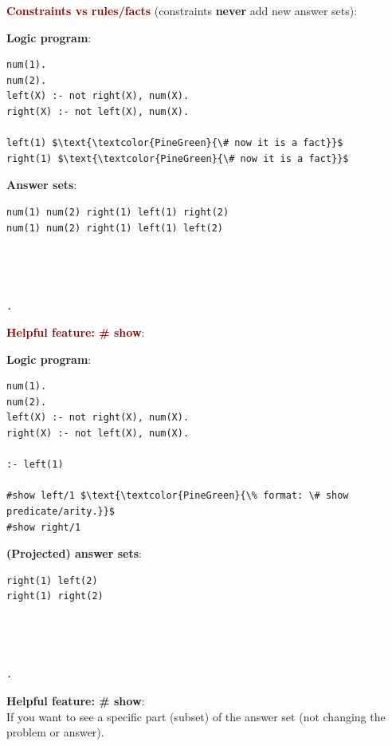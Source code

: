 {\Large \textbf{\textcolor{Maroon}{Constraints vs rules/facts}}} (constraints \textbf{never} add new answer sets): \\
\begin{minipage}{0.5\textwidth}
\textbf{Logic program}:
\begin{lstlisting}
num(1).
num(2).
left(X) :- not right(X), num(X).
right(X) :- not left(X), num(X).

left(1) $\text{\textcolor{PineGreen}{\# now it is a fact}}$
right(1) $\text{\textcolor{PineGreen}{\# now it is a fact}}$
\end{lstlisting}
\end{minipage}
\begin{minipage}{0.5\textwidth}
\textbf{Answer sets}:
\begin{lstlisting}
num(1) num(2) right(1) left(1) right(2)
num(1) num(2) right(1) left(1) left(2)




.
\end{lstlisting}
\end{minipage}

\vspace{0.35cm}


{\Large \textbf{\textcolor{Maroon}{Helpful feature: \# show}}}: \\
\begin{minipage}{0.6\textwidth}
\textbf{Logic program}:
\begin{lstlisting}
num(1).
num(2).
left(X) :- not right(X), num(X).
right(X) :- not left(X), num(X).

:- left(1) 

#show left/1 $\text{\textcolor{PineGreen}{\% format: \# show predicate/arity.}}$
#show right/1
\end{lstlisting}
\end{minipage}
\begin{minipage}{0.4\textwidth}
\textbf{(Projected) answer sets}:
\begin{lstlisting}
right(1) left(2)
right(1) right(2)




.
\end{lstlisting}
\end{minipage}

\vspace{0.5cm}
\textbf{Helpful feature: \# show}: \\
If you want to see a specific part (subset) of the answer set (not changing the problem or answer). \\

